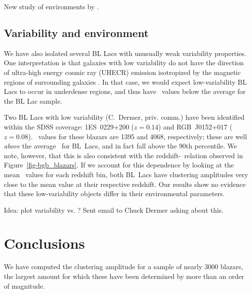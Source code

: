 \documentclass[useAMS,usenatbib]{mn2e}
\begin{document}
New study of environments by \citet{ram13}. 

\subsection{Variability and environment}

We have also isolated several BL Lacs with unusually weak variability properties. One interpretation is that galaxies with low variability do not have the direction of ultra-high energy cosmic ray (UHECR) emission isotropized by the magnetic regions of surrounding galaxies \citep{raz12}. In that case, we would expect low-variability BL Lacs to occur in underdense regions, and thus have \bgb~values below the average for the BL Lac sample.  

Two BL Lacs with low variability (C.~Dermer, priv. comm.) have been identified within the SDSS coverage: 1ES~0229+200 ($z=0.14$) and RGB~J0152+017 ($z=0.08$). \bgb~values for these blazars are 1395 and 4068, respectively; these are well {\it above} the average \bgb~for BL~Lacs, and in fact fall above the 90th percentile. We note, however, that this is also consistent with the redshift-\bgb~relation observed in Figure~\ref{fig-bgb_blazars}. If we account for this dependence by looking at the mean \bgb~values for each redshift bin, both BL~Lacs have clustering amplitudes very close to the mean value at their respective redshift. Our results show no evidence that these low-variability objects differ in their environmental parameters.  

Idea: plot variability vs. \bgb? Sent email to Chuck Dermer asking about this. 


\section{Conclusions}\label{sec_conclusions}

We have computed the clustering amplitude for a sample of nearly 3000 blazars, the largest amount for which these have been determined by more than an order of magnitude. 


%





\bsp

\label{lastpage}
\end{document}
